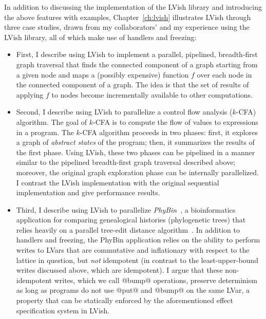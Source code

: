 In addition to discussing the implementation of the LVish library and
introducing the above features with examples, Chapter~\ref{ch:lvish}
illustrates LVish through three case studies, drawn from my
collaborators' and my experience using the LVish library, all of which
make use of handlers and freezing:
\begin{itemize}
\item First, I describe using LVish to implement a parallel,
  pipelined, breadth-first graph traversal that finds the connected
  component of a graph starting from a given node and maps a (possibly
  expensive) function $f$ over each node in the connected component of
  a graph.  The idea is that the set of results of applying $f$ to
  nodes become incrementally available to other computations.
\item Second, I describe using LVish to parallelize a control flow
  analysis ($k$-CFA) algorithm.  The goal of $k$-CFA is to compute the
  flow of values to expressions in a program.  The $k$-CFA algorithm
  proceeds in two phases: first, it explores a graph of \emph{abstract
    states} of the program; then, it summarizes the results of the
  first phase.  Using LVish, these two phases can be pipelined in a
  manner similar to the pipelined breadth-first graph traversal
  described above; moreover, the original graph exploration phase can
  be internally parallelized.  I contrast the LVish implementation
  with the original sequential implementation and give performance
  results.
\item Third, I describe using LVish to parallelize
  \emph{PhyBin}~\cite{PhyBin}, a bioinformatics application for
  comparing genealogical histories (phylogenetic trees) that relies
  heavily on a parallel tree-edit distance algorithm~\cite{hashrf}.
  In addition to handlers and freezing, the PhyBin application relies
  on the ability to perform writes to LVars that are commutative and
  inflationary with respect to the lattice in question, but \emph{not}
  idempotent (in contrast to the least-upper-bound writes discussed
  above, which are idempotent).  I argue that these non-idempotent
  writes, which we call @bump@ operations, preserve determinism as
  long as programs do not use @put@ and @bump@ on the same LVar, a
  property that can be statically enforced by the aforementioned
  effect specification system in LVish.  

\end{itemize}

